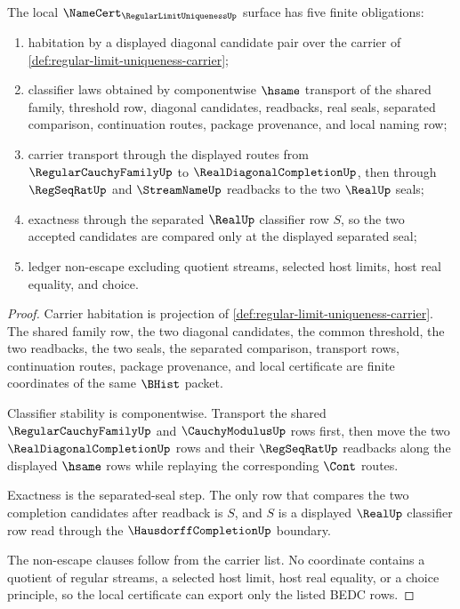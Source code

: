 \begin{theorem}
\label{thm:regular-limit-uniqueness-namecert-obligations}
The local $\NameCert_{\RegularLimitUniquenessUp}$ surface has five finite obligations:
\begin{enumerate}
\item habitation by a displayed diagonal candidate pair over the carrier of \autoref{def:regular-limit-uniqueness-carrier};
\item classifier laws obtained by componentwise $\hsame$ transport of the shared family, threshold row, diagonal candidates, readbacks, real seals, separated comparison, continuation routes, package provenance, and local naming row;
\item carrier transport through the displayed routes from $\RegularCauchyFamilyUp$ to $\RealDiagonalCompletionUp$, then through $\RegSeqRatUp$ and $\StreamNameUp$ readbacks to the two $\RealUp$ seals;
\item exactness through the separated $\RealUp$ classifier row $S$, so the two accepted candidates are compared only at the displayed separated seal;
\item ledger non-escape excluding quotient streams, selected host limits, host real equality, and choice.
\end{enumerate}
\end{theorem}
\begin{proof}
Carrier habitation is projection of \autoref{def:regular-limit-uniqueness-carrier}. The shared family row, the two diagonal candidates, the common threshold, the two readbacks, the two seals, the separated comparison, transport rows, continuation routes, package provenance, and local certificate are finite coordinates of the same $\BHist$ packet.

Classifier stability is componentwise. Transport the shared $\RegularCauchyFamilyUp$ and $\CauchyModulusUp$ rows first, then move the two $\RealDiagonalCompletionUp$ rows and their $\RegSeqRatUp$ readbacks along the displayed $\hsame$ rows while replaying the corresponding $\Cont$ routes.

Exactness is the separated-seal step. The only row that compares the two completion candidates after readback is $S$, and $S$ is a displayed $\RealUp$ classifier row read through the $\HausdorffCompletionUp$ boundary.

The non-escape clauses follow from the carrier list. No coordinate contains a quotient of regular streams, a selected host limit, host real equality, or a choice principle, so the local certificate can export only the listed BEDC rows.
\end{proof}

